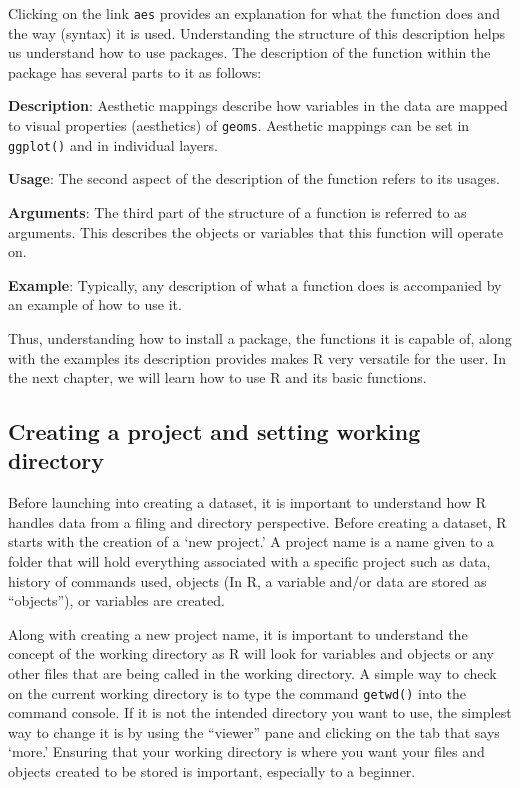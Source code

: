 \documentclass[]{book}
\begin{document}
Clicking on the link \texttt{aes} provides an explanation for what the
function does and the way (syntax) it is used. Understanding the
structure of this description helps us understand how to use packages.
The description of the function within the package has several parts to
it as follows:

\textbf{Description}: Aesthetic mappings describe how variables in the
data are mapped to visual properties (aesthetics) of \texttt{geoms}.
Aesthetic mappings can be set in \texttt{ggplot()} and in individual
layers.

\textbf{Usage}: The second aspect of the description of the function
refers to its usages.

\textbf{Arguments}: The third part of the structure of a function is
referred to as arguments. This describes the objects or variables that
this function will operate on.

\textbf{Example}: Typically, any description of what a function does is
accompanied by an example of how to use it.

Thus, understanding how to install a package, the functions it is
capable of, along with the examples its description provides makes R
very versatile for the user. In the next chapter, we will learn how to
use R and its basic functions.

\subsection{Creating a project and setting working
directory}\label{creating-a-project-and-setting-working-directory}

Before launching into creating a dataset, it is important to understand
how R handles data from a filing and directory perspective. Before
creating a dataset, R starts with the creation of a `new project.' A
project name is a name given to a folder that will hold everything
associated with a specific project such as data, history of commands
used, objects (In R, a variable and/or data are stored as ``objects''),
or variables are created.

Along with creating a new project name, it is important to understand
the concept of the working directory as R will look for variables and
objects or any other files that are being called in the working
directory. A simple way to check on the current working directory is to
type the command \texttt{getwd()} into the command console. If it is not
the intended directory you want to use, the simplest way to change it is
by using the ``viewer'' pane and clicking on the tab that says `more.'
Ensuring that your working directory is where you want your files and
objects created to be stored is important, especially to a beginner.
\end{document}
